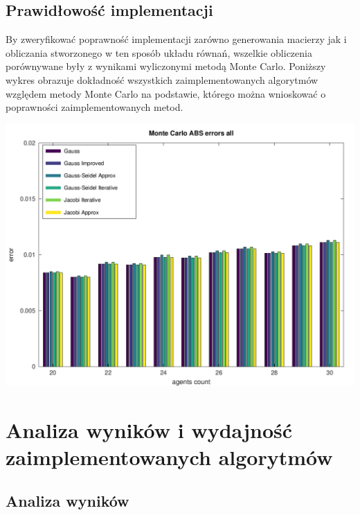 \documentclass[10pt]{article}
\begin{document}
\subsection{Prawidłowość implementacji}
By zweryfikować poprawność implementacji zarówno generowania macierzy jak i obliczania stworzonego w ten sposób układu równań, wszelkie obliczenia porównywane były z wynikami wyliczonymi metodą Monte Carlo. Poniższy wykres obrazuje dokładność wszystkich zaimplementowanych algorytmów względem metody Monte Carlo na podstawie, którego można wnioskować o poprawności zaimplementowanych metod.

\includegraphics[scale=0.75]{plots/01_abs_all_methods_all_rows.png}

\section{Analiza wyników i wydajność zaimplementowanych algorytmów}

\subsection{Analiza wyników}
\end{document}
